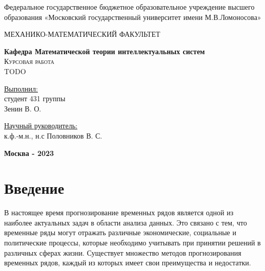 \documentclass[diploma]{nanolab2015}
\begin{document}
\begin{titlepage}
    \begin{center}
        \large
        Федеральное государственное бюджетное образовательное учреждение
        высшего образования «Московский государственный университет имени
        М.В.Ломоносова»

        МЕХАНИКО-МАТЕМАТИЧЕСКИЙ ФАКУЛЬТЕТ

        \textbf{Кафедра Математической теории интеллектуальных систем}\\
        \vspace{4cm}
        \textsc{\Large Курсовая работа}\\[5mm]
        {\LARGE TODO}
    \end{center}
    \vspace{3cm}
    \null

    \begin{flushright}
        \normalsize \underline{Выполнил:}
        \\студент 431 группы
        \\Зенин В. О.
        \\ \underline{\hspace{4cm}}
    \end{flushright}
    \vspace{1cm}

    \begin{flushright}
        \normalsize \underline{Научный руководитель:}
        \\к.ф.-м.н., н.с Половников В. С.
        \\ \underline{\hspace{4cm}}
    \end{flushright}

    \vfill
    \begin{center}
        \textbf{Москва - 2023}
    \end{center}
\end{titlepage}
\setcounter{page}{3}
\clearpage
\tableofcontents{}  %
\clearpage
\chapter{Введение}
В настоящее время прогнозирование временных рядов является одной из наиболее актуальных задач в области анализа данных. Это связано с тем, что временные ряды могут отражать различные экономические, социальные и политические процессы, которые необходимо учитывать при принятии решений в различных сферах жизни. Существует множество методов прогнозирования временных рядов, каждый из которых имеет свои преимущества и недостатки.
\end{document}
